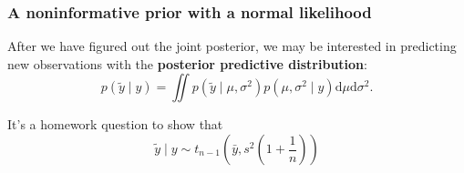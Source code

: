 \documentclass{beamer}
\begin{document}






\begin{frame}
\frametitle{A noninformative prior with a normal likelihood}

After we have figured out the joint posterior, we may be interested in predicting new observations with the {\bf posterior predictive distribution}:
\[
p(\tilde{y} \mid y) = \iint p(\tilde{y} \mid \mu, \sigma^2) p(\mu, \sigma^2 \mid y) \text{d} \mu \text{d} \sigma^2.
\]

It's a homework question to show that 
\[
\tilde{y} \mid y \sim t_{n-1}\left(\bar{y}, s^2\left(1 + \frac{1}{n} \right) \right)
\]

\end{frame}
\end{document}
